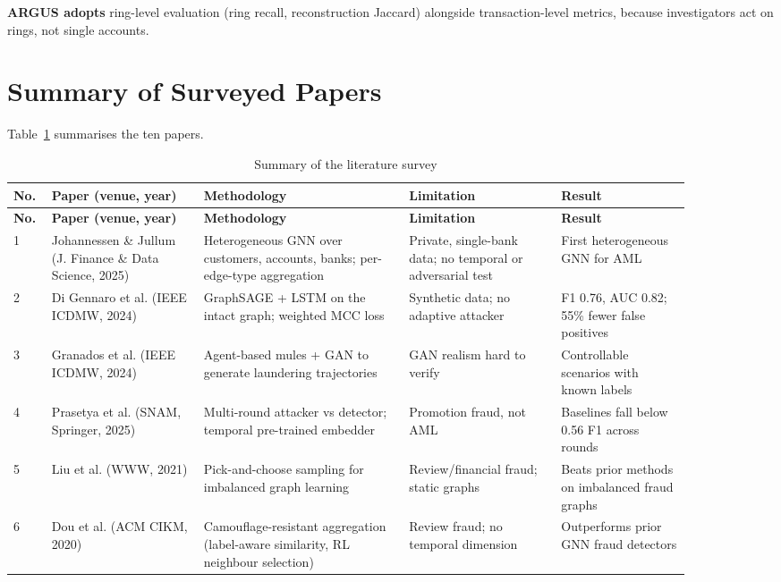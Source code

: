 \textbf{ARGUS adopts} ring-level evaluation (ring recall, reconstruction Jaccard) alongside transaction-level metrics, because investigators act on rings, not single accounts.

\section{Summary of Surveyed Papers}
Table~\ref{tab:survey} summarises the ten papers.

{\small
\renewcommand{\arraystretch}{1.25}
\begin{longtable}{|p{0.04\linewidth}|p{0.20\linewidth}|p{0.27\linewidth}|p{0.20\linewidth}|p{0.17\linewidth}|}
\caption{Summary of the literature survey}\label{tab:survey}\\
\hline
\textbf{No.} & \textbf{Paper (venue, year)} & \textbf{Methodology} & \textbf{Limitation} & \textbf{Result} \\ \hline
\endfirsthead
\hline
\textbf{No.} & \textbf{Paper (venue, year)} & \textbf{Methodology} & \textbf{Limitation} & \textbf{Result} \\ \hline
\endhead
1 & Johannessen \& Jullum \cite{johannessen2025finding} (J. Finance \& Data Science, 2025) & Heterogeneous GNN over customers, accounts, banks; per-edge-type aggregation & Private, single-bank data; no temporal or adversarial test & First heterogeneous GNN for AML \\ \hline
2 & Di Gennaro et al. \cite{digennaro2024amatriciana} (IEEE ICDMW, 2024) & GraphSAGE + LSTM on the intact graph; weighted MCC loss & Synthetic data; no adaptive attacker & F1 0.76, AUC 0.82; 55\% fewer false positives \\ \hline
3 & Granados et al. \cite{granados2024gan} (IEEE ICDMW, 2024) & Agent-based mules + GAN to generate laundering trajectories & GAN realism hard to verify & Controllable scenarios with known labels \\ \hline
4 & Prasetya et al. \cite{prasetya2025multi} (SNAM, Springer, 2025) & Multi-round attacker vs detector; temporal pre-trained embedder & Promotion fraud, not AML & Baselines fall below 0.56 F1 across rounds \\ \hline
5 & Liu et al. \cite{liu2021pick} (WWW, 2021) & Pick-and-choose sampling for imbalanced graph learning & Review/financial fraud; static graphs & Beats prior methods on imbalanced fraud graphs \\ \hline
6 & Dou et al. \cite{dou2020enhancing} (ACM CIKM, 2020) & Camouflage-resistant aggregation (label-aware similarity, RL neighbour selection) & Review fraud; no temporal dimension & Outperforms prior GNN fraud detectors \\ \hline

\end{longtable}}
